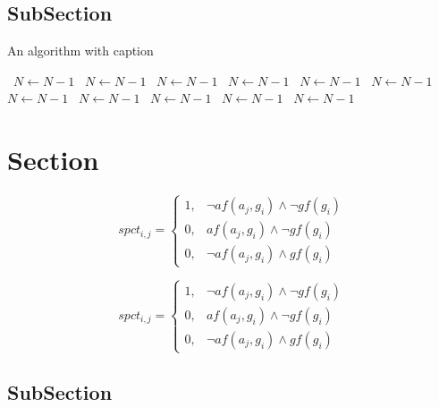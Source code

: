 \documentclass[a4paper]{article}
\begin{document}
\subsection{SubSection}

\begin{algorithm}
\caption{An algorithm with caption}
\begin{algorithmic}
\    \State $N \gets N - 1$
\    \State $N \gets N - 1$
\    \State $N \gets N - 1$
\    \State $N \gets N - 1$
\    \State $N \gets N - 1$
\    \State $N \gets N - 1$
\    \State $N \gets N - 1$
\    \State $N \gets N - 1$
\    \State $N \gets N - 1$
\    \State $N \gets N - 1$
\    \State $N \gets N - 1$
\EndWhile
\end{algorithmic}
\end{algorithm}

\section{Section}

\begin{equation}
spct_{i,j} =
\begin{cases}
1, & \text{$\neg af(a_j,g_i) \wedge \neg gf(g_i)$}\\
0, & \text{$af(a_j,g_i) \wedge \neg gf(g_i)$}\\
0, & \text{$\neg af(a_j,g_i) \wedge gf(g_i)$}
\end{cases}
\end{equation}

\begin{equation}
spct_{i,j} =
\begin{cases}
1, & \text{$\neg af(a_j,g_i) \wedge \neg gf(g_i)$}\\
0, & \text{$af(a_j,g_i) \wedge \neg gf(g_i)$}\\
0, & \text{$\neg af(a_j,g_i) \wedge gf(g_i)$}
\end{cases}
\end{equation}

\subsection{SubSection}
\end{document}
